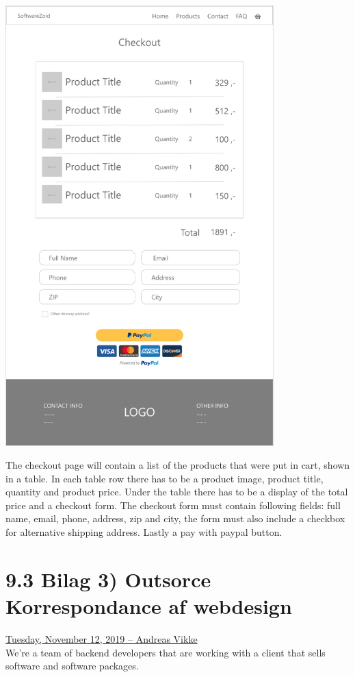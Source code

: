 \documentclass[11pt]{report}
\begin{document}
\begin{center}
\includegraphics[height=17cm]{page7}
\end{center}
\noindent The checkout page will contain a list of the products that were put in cart, shown in a table. In each table row there has to be a product image, product title, quantity and product price. Under the table there has to be a display of the total price and a checkout form. The checkout form must contain following fields: full name, email, phone, address, zip and city, the form must also include a checkbox for alternative shipping address. Lastly a pay with paypal button.

\newpage
\section*{9.3 Bilag 3) Outsorce Korrespondance af webdesign}

\noindent\underline{Tuesday, November 12, 2019 – Andreas Vikke}\\
\noindent We're a team of backend developers that are working with a client that sells software and software packages.
\end{document}
